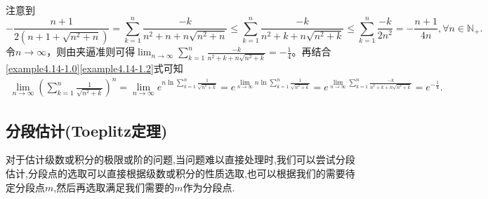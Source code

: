 \documentclass[lang=cn,newtx,10pt,scheme=chinese]{elegantbook}
\begin{document}
\begin{solution}
\begin{align}
\end{align}
注意到
\[
-\frac{n+1}{2\left( n+1+\sqrt{n^2+n} \right)}=\sum_{k=1}^n{\frac{-k}{n^2+n+n\sqrt{n^2+n}}}\leqslant \sum_{k=1}^n{\frac{-k}{n^2+k+n\sqrt{n^2+k}}}\leqslant \sum_{k=1}^n{\frac{-k}{2n^2}}=-\frac{n+1}{4n},\forall n\in \mathbb{N}_+.
\]
令\(n\rightarrow \infty\)，则由夹逼准则可得\(\lim_{n\rightarrow \infty} \sum_{k=1}^n{\frac{-k}{n^2+k+n\sqrt{n^2+k}}}=-\frac{1}{4}\)。再结合\eqref{example4.14-1.0}\eqref{example4.14-1.2}式可知
\begin{align*}
\lim_{n\rightarrow \infty} \left( \sum_{k=1}^n{\frac{1}{\sqrt{n^2+k}}} \right) ^n=\lim_{n\rightarrow \infty} e^{n\ln \sum\limits_{k=1}^n{\frac{1}{\sqrt{n^2+k}}}}
=e^{\lim\limits_{n\rightarrow \infty} n\ln \sum\limits_{k=1}^n{\frac{1}{\sqrt{n^2+k}}}}
=e^{\lim\limits_{n\rightarrow \infty} \sum\limits_{k=1}^n{\frac{-k}{n^2+k+n\sqrt{n^2+k}}}}
=e^{-\frac{1}{4}}.
\end{align*}
\end{solution}


\subsection{分段估计(Toeplitz定理)}

对于估计级数或积分的极限或阶的问题,当问题难以直接处理时,我们可以尝试分段估计,分段点的选取可以直接根据级数或积分的性质选取,也可以根据我们的需要待定分段点$m$,然后再选取满足我们需要的$m$作为分段点.
\end{document}
